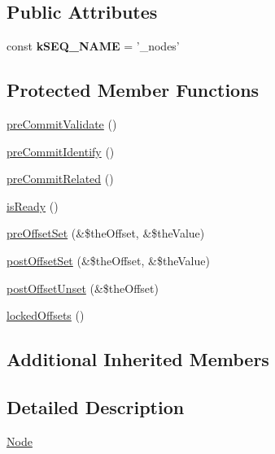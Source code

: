 \subsection*{Public Attributes}
\begin{DoxyCompactItemize}
\item 
\hypertarget{class_ontology_wrapper_1_1_node_a17c5f694f51baf3410f6416753117521}{const {\bfseries k\-S\-E\-Q\-\_\-\-N\-A\-M\-E} = '\-\_\-nodes'}\label{class_ontology_wrapper_1_1_node_a17c5f694f51baf3410f6416753117521}

\end{DoxyCompactItemize}
\subsection*{Protected Member Functions}
\begin{DoxyCompactItemize}
\item 
\hyperlink{class_ontology_wrapper_1_1_node_a44855a38ead2b1df4cc1c403556ef4cf}{pre\-Commit\-Validate} ()
\item 
\hyperlink{class_ontology_wrapper_1_1_node_a640fb49bbcbaddcbef2da20e21b63c15}{pre\-Commit\-Identify} ()
\item 
\hyperlink{class_ontology_wrapper_1_1_node_ad4e2344332f46e77895af1b7695a7653}{pre\-Commit\-Related} ()
\item 
\hyperlink{class_ontology_wrapper_1_1_node_af513e1e79f8c7dd360a3adb4265b315e}{is\-Ready} ()
\item 
\hyperlink{class_ontology_wrapper_1_1_node_ab4a822309bead01e44c8e6d21cbbbc9b}{pre\-Offset\-Set} (\&\$the\-Offset, \&\$the\-Value)
\item 
\hyperlink{class_ontology_wrapper_1_1_node_ab8bf8f281ec784217a001a55b265ddfc}{post\-Offset\-Set} (\&\$the\-Offset, \&\$the\-Value)
\item 
\hyperlink{class_ontology_wrapper_1_1_node_ae5c0530b5499cdb995278fd63184a38a}{post\-Offset\-Unset} (\&\$the\-Offset)
\item 
\hyperlink{class_ontology_wrapper_1_1_node_aea89165149368db575c3da6fd4279785}{locked\-Offsets} ()
\end{DoxyCompactItemize}
\subsection*{Additional Inherited Members}


\subsection{Detailed Description}
\hyperlink{class_ontology_wrapper_1_1_node}{Node}

